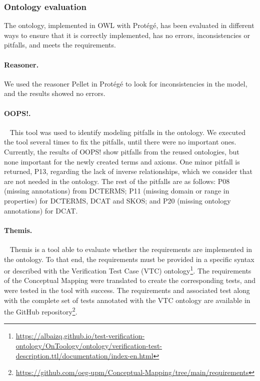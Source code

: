 \subsubsection{Ontology evaluation}
\label{sec:chp4_cm-eval}


The ontology, implemented in OWL with Protégé, has been evaluated in different ways to ensure that it is correctly implemented, has no errors, inconsistencies or pitfalls, and meets the requirements.

\noindent\paragraph{\textbf{Reasoner.}} We used the reasoner Pellet in Protégé to look for inconsistencies in the model, and the results showed no errors.

\noindent\paragraph{\textbf{OOPS!.}}~\cite{poveda2014oops} This tool was used to identify modeling pitfalls in the ontology. We executed the tool several times to fix the pitfalls, until there were no important ones. Currently, the results of OOPS! show pitfalls from the reused ontologies, but none important for the newly created terms and axioms. One minor pitfall is returned, P13, regarding the lack of inverse relationships, which we consider that are not  needed in the ontology. The rest of the pitfalls are as follows: P08 (missing annotations) from DCTERMS; P11 (missing domain or range in properties) for DCTERMS, DCAT and SKOS; and P20 (missing ontology annotations) for DCAT.

\noindent\paragraph{\textbf{Themis.}}~\cite{fernandez2021themis} Themis is a tool able to evaluate whether the requirements are implemented in the ontology. To that end, the requirements must be provided in a specific syntax or described with the Verification Test Case (VTC) ontology\footnote{\url{https://albaizq.github.io/test-verification-ontology/OnToology/ontology/verification-test-description.ttl/documentation/index-en.html}}. The requirements of the Conceptual Mapping were translated to create the corresponding tests, and were tested in the tool with success. The requirements and associated test along with the complete set of tests annotated with the VTC ontology are available in the GitHub repository\footnote{\url{https://github.com/oeg-upm/Conceptual-Mapping/tree/main/requirements}}.

